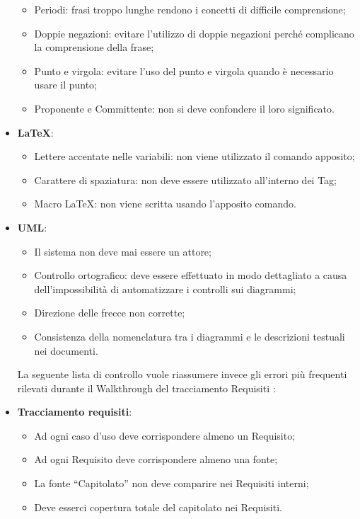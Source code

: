 \begin{itemize}
\begin{itemize}
\item Periodi: frasi troppo lunghe rendono i concetti di difficile comprensione;
\item Doppie negazioni: evitare l’utilizzo di doppie negazioni perché complicano la
comprensione della frase;
\item Punto e virgola: evitare l’uso del punto e virgola quando è necessario usare
il punto;
\item Proponente e Committente: non si deve confondere il loro significato.
\end{itemize}
\item \textbf{\LaTeX}:
\begin{itemize}
\item Lettere accentate nelle variabili: non viene utilizzato il comando apposito;
\item Carattere di spaziatura: non deve essere utilizzato all’interno dei Tag;
\item Macro \LaTeX: non viene scritta usando l'apposito comando.
\end{itemize}
\item \textbf{UML}:
\begin{itemize}
\item Il sistema non deve mai essere un attore;
\item Controllo ortografico: deve essere effettuato in modo dettagliato a causa dell'impossibilità di automatizzare i controlli sui diagrammi;
\item Direzione delle frecce non corrette;
\item Consistenza della nomenclatura tra i diagrammi e le descrizioni testuali nei documenti.
\end{itemize}
La seguente lista di controllo vuole riassumere invece gli errori più frequenti rilevati
durante il Walkthrough del tracciamento Requisiti :

\item \textbf{Tracciamento requisiti}:
\begin{itemize}

\item Ad ogni caso d’uso deve corrispondere almeno un Requisito;
\item Ad ogni Requisito deve corrispondere almeno una fonte;
\item La fonte “Capitolato” non deve comparire nei Requisiti interni;
\item Deve esserci copertura totale del capitolato nei Requisiti.

\end{itemize}
\end{itemize}
